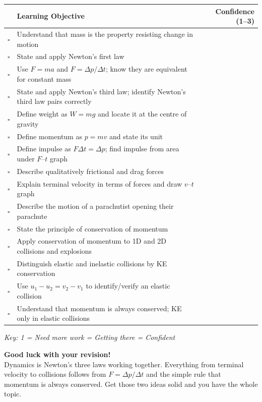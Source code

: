 \begin{tcolorbox}[colback=white, colframe=darkblue, breakable]
\renewcommand{\arraystretch}{1.5}
\begin{tabular}{@{} c p{10.5cm} r @{}}
\toprule
 & \textbf{Learning Objective} & \textbf{Confidence (1--3)} \\
\midrule
$\square$ & Understand that mass is the property resisting change in motion & \\
$\square$ & State and apply Newton's first law & \\
$\square$ & Use $F = ma$ and $F = \Delta p/\Delta t$; know they are equivalent for constant mass & \\
$\square$ & State and apply Newton's third law; identify Newton's third law pairs correctly & \\
$\square$ & Define weight as $W = mg$ and locate it at the centre of gravity & \\
$\square$ & Define momentum as $p = mv$ and state its unit & \\
$\square$ & Define impulse as $F\Delta t = \Delta p$; find impulse from area under $F$--$t$ graph & \\
$\square$ & Describe qualitatively frictional and drag forces & \\
$\square$ & Explain terminal velocity in terms of forces and draw $v$--$t$ graph & \\
$\square$ & Describe the motion of a parachutist opening their parachute & \\
$\square$ & State the principle of conservation of momentum & \\
$\square$ & Apply conservation of momentum to 1D and 2D collisions and explosions & \\
$\square$ & Distinguish elastic and inelastic collisions by KE conservation & \\
$\square$ & Use $u_1 - u_2 = v_2 - v_1$ to identify/verify an elastic collision & \\
$\square$ & Understand that momentum is always conserved; KE only in elastic collisions & \\
\bottomrule
\end{tabular}
\vspace{0.5em}
\textit{Key: 1 = Need more work  = Getting there  = Confident}
\end{tcolorbox}

\vspace{1em}
\begin{motivationbox}
\centering
\textbf{\color{darkblue}Good luck with your revision!}\\[0.2em]
{\color{darkgray}\small Dynamics is Newton's three laws working together. Everything from terminal velocity to collisions follows from $F = \Delta p/\Delta t$ and the simple rule that momentum is always conserved. Get those two ideas solid and you have the whole topic.}
\end{motivationbox}

